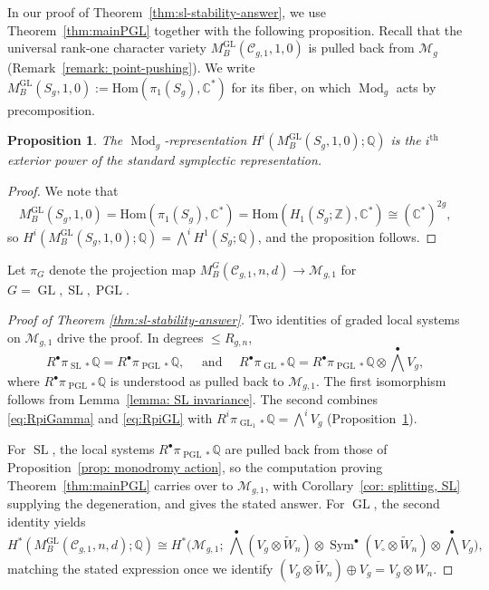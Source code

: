 \documentclass[11pt,reqno]{amsart}
\theoremstyle{plain} %
\newtheorem{prop}[theorem]{Proposition}
\theoremstyle{definition}
\newcommand{\QQ}{\mathbb{Q}}
\newcommand{\CC}{\mathbb{C}}
\newcommand{\Hom}{\mathrm{Hom}}
\newcommand{\M}{\mathcal{M}}
\newcommand{\C}{\mathcal{C}}
\newcommand{\ZZ}{\mathbb{Z}}
\DeclareMathOperator{\GL}{GL}
\DeclareMathOperator{\SL}{SL}
\DeclareMathOperator{\PGL}{PGL}
\DeclareMathOperator{\Mod}{Mod}
\DeclareMathOperator{\Sym}{Sym}
\newcommand{\tW}{\widetilde{W}}
\begin{document}
In our proof of Theorem~\ref{thm:sl-stability-answer}, we use Theorem~\ref{thm:mainPGL} together with the following proposition. Recall that the universal rank-one character variety $M_B^{\GL}(\C_{g,1},1,0)$ is pulled back from $\M_g$ (Remark~\ref{remark: point-pushing}). We write $M_B^{\GL}(S_g,1,0) := \Hom(\pi_1(S_g),\CC^*)$ for its fiber, on which $\Mod_g$ acts by precomposition.

\begin{prop}\label{prop: GL1 monodromy}
    The $\Mod_g$-representation $H^i(M_B^{\GL}(S_g,1,0); \QQ)$ is the $i^{\textrm{th}}$ exterior power of the standard symplectic representation.
\end{prop}

\begin{proof}
    We note that
    $$M_B^{\GL}(S_g,1,0) = \Hom(\pi_1(S_g), \CC^*) = \Hom(H_1(S_g; \ZZ), \CC^*) \cong (\CC^*)^{2g},$$
    so $H^i(M_B^{\GL}(S_g,1,0); \QQ) = \textstyle{\bigwedge^i} H^1(S_g;\QQ)$, and the proposition follows. %
\end{proof}




Let $\pi_G$ denote the projection map $M_B^G(\C_{g,1},n,d) \to \M_{g,1}$ for $G = \GL, \SL, \PGL$.     

\begin{proof}[Proof of Theorem \ref{thm:sl-stability-answer}]
Two identities of graded local systems on $\M_{g,1}$ drive the proof. In degrees $\le R_{g,n}$,
\[
R^\bullet\pi_{\SL *}\QQ = R^\bullet\pi_{\PGL *}\QQ,
\quad \mbox{ and } \quad 
R^\bullet\pi_{\GL *}\QQ = R^\bullet\pi_{\PGL *}\QQ \otimes \textstyle{\bigwedge^\bullet} V_g,
\]
where $R^\bullet\pi_{\PGL *}\QQ$ is understood as pulled back to $\M_{g,1}$. The first isomorphism follows from Lemma~\ref{lemma: SL invariance}. The second combines \eqref{eq:RpiGamma} and \eqref{eq:RpiGL} with $R^i\pi_{\GL_1 *}\QQ=\bigwedge^iV_g$ (Proposition~\ref{prop: GL1 monodromy}).

For $\SL$, the local systems $R^\bullet\pi_{\PGL *}\QQ$ are pulled back from those of Proposition~\ref{prop: monodromy action}, so the computation proving Theorem~\ref{thm:mainPGL} carries over to $\M_{g,1}$, with Corollary~\ref{cor: splitting, SL} supplying the degeneration, and gives the stated answer. For $\GL$, the second identity yields
\[
H^*(M_B^{\GL}(\C_{g,1},n,d); \QQ) \cong H^*\big(\M_{g,1};\, \textstyle{\bigwedge^\bullet}(V_g \otimes \tW_n) \otimes \Sym^\bullet(V_\circ \otimes \tW_n) \otimes \textstyle{\bigwedge^\bullet} V_g\big),
\]
matching the stated expression once we identify $(V_g \otimes \tW_n) \oplus V_g = V_g \otimes W_n$. 
\end{proof}
\end{document}
